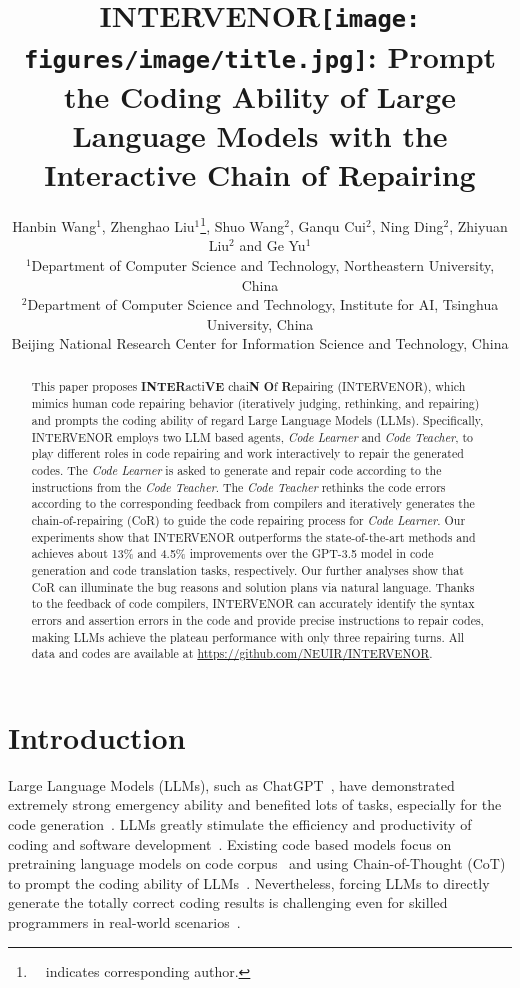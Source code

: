 \documentclass[11pt]{article}
\title{{\bf \textsc{INTERVENOR}\texttt{[image: figures/image/title.jpg]}}: Prompt the Coding Ability of Large Language Models with the Interactive Chain of Repairing}
\author{Hanbin Wang$^{1}$, Zhenghao Liu$^{1}$\thanks{ \ \ indicates corresponding author.}, Shuo Wang$^{2}$, Ganqu Cui$^{2}$, Ning Ding$^{2}$, Zhiyuan Liu$^{2}$ and Ge Yu$^{1}$ \\ 
$^1$Department of Computer Science and Technology, Northeastern University, China \\
$^2$Department of Computer Science and Technology, Institute for AI, Tsinghua University, China \\
Beijing National Research Center for Information Science and Technology, China \\
}
\begin{document}
\maketitle
\begin{abstract}
This paper proposes \textbf{INTER}acti\textbf{VE} chai\textbf{N} \textbf{O}f \textbf{R}epairing (INTERVENOR), which mimics human code repairing behavior (iteratively judging, rethinking, and repairing) and prompts the coding ability of regard Large Language Models (LLMs). Specifically, INTERVENOR employs two LLM based agents, \textit{Code Learner} and \textit{Code Teacher}, to play different roles in code repairing and work interactively to repair the generated codes. The \textit{Code Learner} is asked to generate and repair code according to the instructions from the \textit{Code Teacher}. The \textit{Code Teacher} rethinks the code errors according to the corresponding feedback from compilers and iteratively generates the chain-of-repairing (CoR) to guide the code repairing process for \textit{Code Learner}. Our experiments show that INTERVENOR outperforms the state-of-the-art methods and achieves about 13\% and 4.5\% improvements over the GPT-3.5 model in code generation and code translation tasks, respectively. Our further analyses show that CoR can illuminate the bug reasons and solution plans via natural language. Thanks to the feedback of code compilers, INTERVENOR can accurately identify the syntax errors and assertion errors in the code and provide precise instructions to repair codes, making LLMs achieve the plateau performance with only three repairing turns. All data and codes are available at \url{https://github.com/NEUIR/INTERVENOR}.
 \end{abstract}



\section{Introduction}
Large Language Models (LLMs), such as ChatGPT~\cite{chatgpt}, have demonstrated extremely strong emergency ability and benefited lots of tasks, especially for the code generation~\cite{openai2023gpt4,roziere2023code,wang2023codet5+}. LLMs greatly stimulate the efficiency and productivity of coding and software development~\cite{qian2023communicative}. Existing code based models focus on pretraining language models on code corpus~\cite{muennighoff2023octopack,luo2023wizardcoder,li2023starcoder,zheng2023codegeex} and using Chain-of-Thought (CoT) to prompt the coding ability of LLMs~\cite{wei2023chainofthought,huang2023codecot,li2023structured}. Nevertheless, forcing LLMs to directly generate the totally correct coding results is challenging even for skilled programmers in real-world scenarios~\cite{chen2023teaching}.
\end{document}
